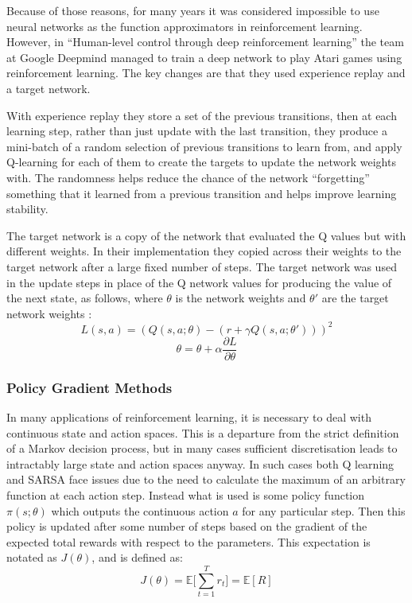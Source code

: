 Because of those reasons, for many years it was considered impossible to use neural networks as the function approximators in reinforcement learning. However, in ``Human-level control through deep reinforcement learning'' \cite{atariDQN} the team at Google Deepmind managed to train a deep network to play Atari games using reinforcement learning. The key changes are that they used experience replay and a target network. 

With experience replay they store a set of the previous transitions, then at each learning step, rather than just update with the last transition, they produce a mini-batch of a random selection of previous transitions to learn from, and apply Q-learning for each of them to create the targets to update the network weights with. The randomness helps reduce the chance of the network ``forgetting'' something that it learned from a previous transition and helps improve learning stability. 

The target network is a copy of the network that evaluated the Q values  but with different weights. In their implementation they copied across their weights to the target network after a large fixed number of steps. The target network was used in the update steps in place of the Q network values for producing the value of the next state, as follows, where $\theta$ is the network weights and $\theta'$ are the target network weights :
\begin{equation*}
L(s,a) = (Q(s,a;\theta) - (r + \gamma Q(s,a; \theta' )))^2
\end{equation*}
\begin{equation}
\theta = \theta + \alpha \frac{\partial L}{\partial \theta}
\end{equation}

\subsubsection{Policy Gradient Methods}
In many applications of reinforcement learning, it is necessary to deal with continuous state and action spaces. This is a departure from the strict definition of a Markov decision process, but in many cases sufficient discretisation leads to intractably large state and action spaces anyway. In such cases both Q learning and SARSA face issues due to the need to calculate the maximum of an arbitrary function at each action step. Instead what is used is some policy function $\pi(s;\theta)$ which outputs the continuous action $a$ for any particular step. Then this policy is updated after some number of steps based on the gradient of the expected total rewards with respect to the parameters. This expectation is notated as $J(\theta)$, and is defined as:
\begin{equation}
J(\theta) = \mathbb{E}\big[\sum_{t=1}^T r_t \big] = \mathbb{E}[R]
\end{equation}

